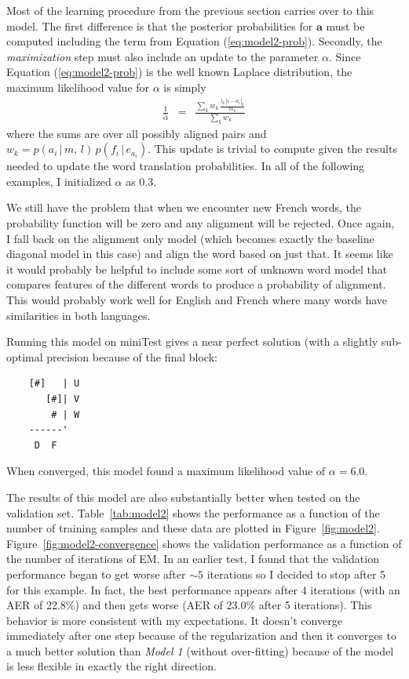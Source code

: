\documentclass[11pt]{article}
\newcommand{\eq}[1]{Equation (\ref{eq:#1})}
\newcommand{\Fig}[1]{Figure~\ref{fig:#1}}
\newcommand{\fig}[1]{Figure~\ref{fig:#1}}
\newcommand{\bvec}[1]{\ensuremath{\boldsymbol{#1}}}
\newcommand{\code}[1]{{\sffamily #1}}
\begin{document}
Most of the learning procedure from the previous section carries over to this
model.
The first difference is that the posterior probabilities for $\bvec{a}$ must
be computed including the term from \eq{model2-prob}.
Secondly, the \emph{maximization} step must also include an update to the
parameter $\alpha$.
Since \eq{model2-prob} is the well known Laplace distribution, the maximum
likelihood value for $\alpha$ is simply
\begin{eqnarray}
\frac{1}{\hat{\alpha}} &=& \frac{\displaystyle{\sum_k w_k \, \frac{l_k\,| i-a_i
    |_k}{m_k}}}{\displaystyle{\sum_k w_k}}
\end{eqnarray}
where the sums are over all possibly aligned pairs and $w_k =
p(a_i\,|\,m,\,l)\,p(f_i\,|\,e_{a_i})$.
This update is trivial to compute given the results needed to update the word
translation probabilities.
In all of the following examples, I initialized $\alpha$ as 0.3.

We still have the problem that when we encounter new French words, the
probability function will be zero and any alignment will be rejected.
Once again, I fall back on the alignment only model (which becomes exactly
the baseline diagonal model in this case) and align the word based on just
that.
It seems like it would probably be helpful to include some sort of unknown
word model that compares features of the different words to produce a
probability of alignment.
This would probably work well for English and French where many words have
similarities in both languages.

Running this model on \code{miniTest} gives a near perfect solution (with a
slightly sub-optimal precision because of the final block:
\begin{lstlisting}
    [#]   | U
       [#]| V
        # | W
    ------'
     D  F
\end{lstlisting}
When converged, this model found a maximum likelihood value of $\alpha=6.0$.

The results of this model are also substantially better when tested on the
validation set.
Table~\ref{tab:model2} shows the performance as a function of the number of
training samples and these data are plotted in \fig{model2}.
\Fig{model2-convergence} shows the validation performance as a function of the
number of iterations of EM.
In an earlier test, I found that the validation performance began to get worse
after $\sim 5$ iterations so I decided to stop after 5 for this example.
In fact, the best performance appears after 4 iterations (with an AER of
22.8\%) and then gets worse (AER of 23.0\% after 5 iterations).
This behavior is more consistent with my expectations.
It doesn't converge immediately after one step because of the regularization
and then it converges to a much better solution than \emph{Model 1} (without
over-fitting) because of the model is less flexible in exactly the right
direction.
\end{document}
